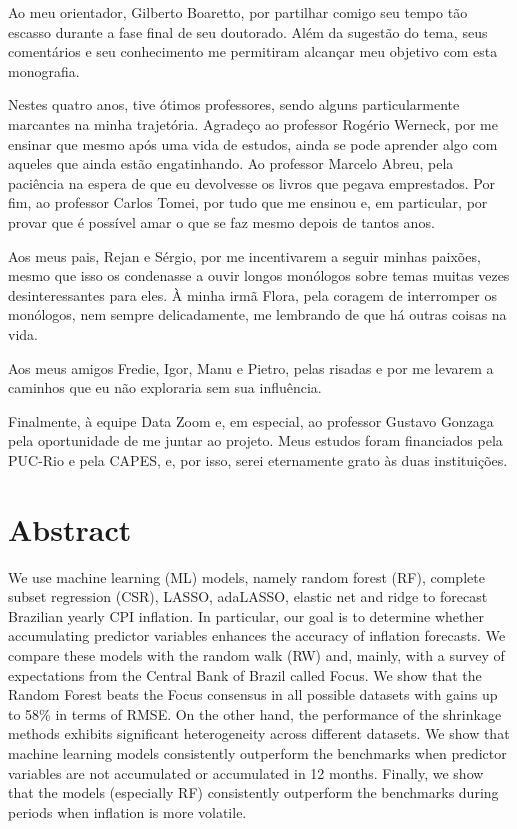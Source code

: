 \documentclass[12pt,openright,twoside,a4paper,brazil,english,emptypage,openany]{abntex2}
\begin{document}
\justifying
\rmfamily

\hspace{1em} Ao meu orientador, Gilberto Boaretto, por partilhar comigo seu tempo tão escasso durante a fase final de seu doutorado. Além da sugestão do tema, seus comentários e seu conhecimento me permitiram alcançar meu objetivo com esta monografia.

Nestes quatro anos, tive ótimos professores, sendo alguns particularmente marcantes na minha trajetória. Agradeço ao professor Rogério Werneck, por me ensinar que mesmo após uma vida de estudos, ainda se pode aprender algo com aqueles que ainda estão engatinhando. Ao professor Marcelo Abreu, pela paciência na espera de que eu devolvesse os livros que pegava emprestados. Por fim, ao professor Carlos Tomei, por tudo que me ensinou e, em particular, por provar que é possível amar o que se faz mesmo depois de tantos anos.  

Aos meus pais, Rejan e Sérgio, por me incentivarem a seguir minhas paixões, mesmo que isso os condenasse a ouvir longos monólogos sobre temas muitas vezes desinteressantes para eles. À minha irmã Flora, pela coragem de interromper os monólogos, nem sempre delicadamente, me lembrando de que há outras coisas na vida.

Aos meus amigos Fredie, Igor, Manu e Pietro, pelas risadas e por me levarem a caminhos que eu não exploraria sem sua influência.

Finalmente, à equipe Data Zoom e, em especial, ao professor Gustavo Gonzaga pela oportunidade de me juntar ao projeto. Meus estudos foram financiados pela PUC-Rio e pela CAPES, e, por isso, serei eternamente grato às duas instituições.  


\newpage
\section*{Abstract}
\justifying

\hspace{1em} We use machine learning (ML) models, namely random forest (RF), complete subset regression (CSR), LASSO, adaLASSO, elastic net and ridge to forecast Brazilian yearly CPI inflation. In particular, our goal is to determine whether accumulating predictor variables enhances the accuracy of inflation forecasts. We compare these models with the random walk (RW) and, mainly, with a survey of expectations from the Central Bank of Brazil called Focus. We show that the Random Forest beats the Focus consensus in all possible datasets with gains up to 58\% in terms of RMSE. On the other hand, the performance of the shrinkage methods exhibits significant heterogeneity across different datasets. We show that machine learning models consistently outperform the benchmarks when predictor variables are not accumulated or accumulated in 12 months. Finally, we show that the models (especially RF) consistently outperform the benchmarks during periods when inflation is more volatile. 
\end{document}
